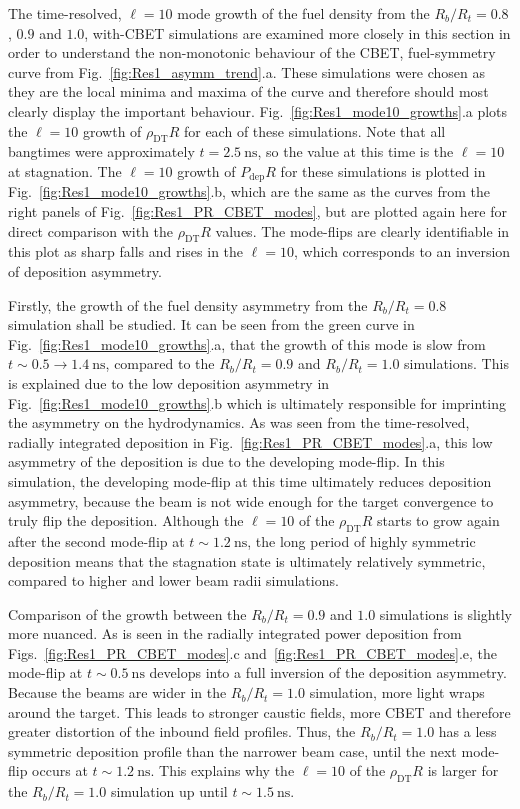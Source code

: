The time-resolved, $\ell=10$ mode growth of the fuel density from the $R_b/R_t=0.8$, $0.9$ and $1.0$, with-\ac{CBET} simulations are examined more closely in this section in order to understand the non-monotonic behaviour of the \ac{CBET}, fuel-symmetry curve from Fig.~\ref{fig:Res1_asymm_trend}.a.
These simulations were chosen as they are the local minima and maxima of the curve and therefore should most clearly display the important behaviour.
Fig.~\ref{fig:Res1_mode10_growths}.a plots the $\ell=10$ growth of $\rho_{\text{DT}}R$ for each of these simulations.
Note that all bangtimes were approximately $t=2.5\ \text{ns}$, so the value at this time is the $\ell=10$ at stagnation.
The $\ell=10$ growth of $P_{\text{dep}}R$ for these simulations is plotted in Fig.~\ref{fig:Res1_mode10_growths}.b, which are the same as the curves from the right panels of Fig.~\ref{fig:Res1_PR_CBET_modes}, but are plotted again here for direct comparison with the $\rho_{\text{DT}}R$ values.
The mode-flips are clearly identifiable in this plot as sharp falls and rises in the $\ell=10$, which corresponds to an inversion of deposition asymmetry.

Firstly, the growth of the fuel density asymmetry from the $R_b/R_t=0.8$ simulation shall be studied.
It can be seen from the green curve in Fig.~\ref{fig:Res1_mode10_growths}.a, that the growth of this mode is slow from $t\sim0.5\rightarrow1.4\ \text{ns}$, compared to the $R_b/R_t=0.9$ and $R_b/R_t=1.0$ simulations.
This is explained due to the low deposition asymmetry in Fig.~\ref{fig:Res1_mode10_growths}.b which is ultimately responsible for imprinting the asymmetry on the hydrodynamics.
As was seen from the time-resolved, radially integrated deposition in Fig.~\ref{fig:Res1_PR_CBET_modes}.a, this low asymmetry of the deposition is due to the developing mode-flip.
In this simulation, the developing mode-flip at this time ultimately reduces deposition asymmetry, because the beam is not wide enough for the target convergence to truly flip the deposition.
Although the $\ell=10$ of the $\rho_{\text{DT}}R$ starts to grow again after the second mode-flip at $t\sim1.2\ \text{ns}$, the long period of highly symmetric deposition means that the stagnation state is ultimately relatively symmetric, compared to higher and lower beam radii simulations.

Comparison of the growth between the $R_b/R_t=0.9$ and $1.0$ simulations is slightly more nuanced.
As is seen in the radially integrated power deposition from Figs.~\ref{fig:Res1_PR_CBET_modes}.c and~\ref{fig:Res1_PR_CBET_modes}.e, the mode-flip at $t\sim0.5\ \text{ns}$ develops into a full inversion of the deposition asymmetry.
Because the beams are wider in the $R_b/R_t=1.0$ simulation, more light wraps around the target.
This leads to stronger caustic fields, more \ac{CBET} and therefore greater distortion of the inbound field profiles.
Thus, the $R_b/R_t=1.0$ has a less symmetric deposition profile than the narrower beam case, until the next mode-flip occurs at $t\sim1.2\ \text{ns}$.
This explains why the $\ell=10$ of the $\rho_{\text{DT}}R$ is larger for the $R_b/R_t=1.0$ simulation up until $t\sim1.5\ \text{ns}$.


